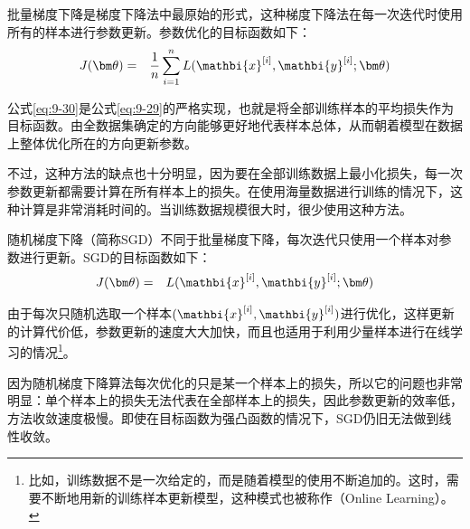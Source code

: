 \vspace{0.5em}

\parinterval 批量梯度下降是梯度下降法中最原始的形式，这种梯度下降法在每一次迭代时使用所有的样本进行参数更新。参数优化的目标函数如下：
\begin{eqnarray}
J({\bm \theta})&=&\frac{1}{n}\sum_{i=1}^{n}{L({\mathbi{x}}^{[i]},{\mathbi{y}}^{[i]};{\bm \theta})}
\label{eq:9-30}
\end{eqnarray}

\parinterval 公式\eqref{eq:9-30}是公式\eqref{eq:9-29}的严格实现，也就是将全部训练样本的平均损失作为目标函数。由全数据集确定的方向能够更好地代表样本总体，从而朝着模型在数据上整体优化所在的方向更新参数。

\parinterval 不过，这种方法的缺点也十分明显，因为要在全部训练数据上最小化损失，每一次参数更新都需要计算在所有样本上的损失。在使用海量数据进行训练的情况下，这种计算是非常消耗时间的。当训练数据规模很大时，很少使用这种方法。

%

\vspace{0.5em}
\vspace{0.5em}

\parinterval 随机梯度下降（简称SGD）不同于批量梯度下降，每次迭代只使用一个样本对参数进行更新。SGD的目标函数如下：
\begin{eqnarray}
J({\bm \theta})&=&L({\mathbi{x}}^{[i]},{\mathbi{y}}^{[i]};{\bm \theta})
\label{eq:9-31}
\end{eqnarray}

\noindent 由于每次只随机选取一个样本$({\mathbi{x}}^{[i]},{\mathbi{y}}^{[i]})$进行优化，这样更新的计算代价低，参数更新的速度大大加快，而且也适用于利用少量样本进行在线学习的情况\footnote{比如，训练数据不是一次给定的，而是随着模型的使用不断追加的。这时，需要不断地用新的训练样本更新模型，这种模式也被称作{\scriptsize{}}（Online Learning）。}。

\parinterval 因为随机梯度下降算法每次优化的只是某一个样本上的损失，所以它的问题也非常明显：单个样本上的损失无法代表在全部样本上的损失，因此参数更新的效率低，方法收敛速度极慢。即使在目标函数为强凸函数的情况下，SGD仍旧无法做到线性收敛。

